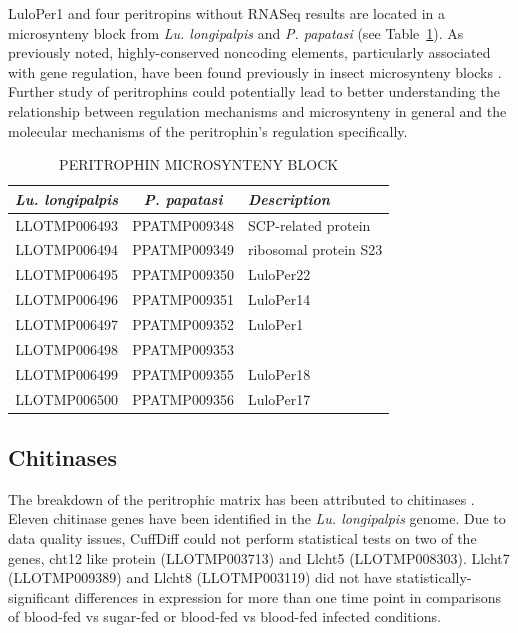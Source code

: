 LuloPer1 and four peritropins without RNASeq results are located in a microsynteny block from \emph{Lu. longipalpis} and \emph{P. papatasi} (see Table~\ref{tab:synteny-llot-ppat-peritrophic}). As previously noted, highly-conserved noncoding elements, particularly associated with gene regulation, have been found previously in insect microsynteny blocks \cite{Engstrom2007}.  Further study of peritrophins could potentially lead to  better understanding the relationship between regulation mechanisms and microsynteny in general and the molecular mechanisms of the peritrophin's regulation specifically.

\begin{table}[H]
  \begin{center}
  \small
  \caption{\label{tab:synteny-llot-ppat-peritrophic} PERITROPHIN MICROSYNTENY BLOCK}
  \begin{tabular}{c c l} \hline
    \emph{Lu. longipalpis} & \emph{P. papatasi} & \emph{Description} \\ \hline
    LLOTMP006493 & PPATMP009348 & SCP-related protein \\
    LLOTMP006494 & PPATMP009349 & ribosomal protein S23 \\
    LLOTMP006495 & PPATMP009350 & LuloPer22 \\
    LLOTMP006496 & PPATMP009351 & LuloPer14 \\
    LLOTMP006497 & PPATMP009352 & LuloPer1 \\
    LLOTMP006498 & PPATMP009353 &  \\
    LLOTMP006499 & PPATMP009355 & LuloPer18 \\
    LLOTMP006500 & PPATMP009356 & LuloPer17
  \end{tabular}
  \end{center}
\end{table}


\subsection{Chitinases}
The breakdown of the peritrophic matrix has been attributed to chitinases \cite{Dostalova2012}. Eleven chitinase genes have been identified in the \emph{Lu. longipalpis} genome. Due to data quality issues, CuffDiff could not perform statistical tests on two of the genes, cht12 like protein (LLOTMP003713) and Llcht5 (LLOTMP008303). Llcht7 (LLOTMP009389) and Llcht8 (LLOTMP003119) did not have statistically-significant differences in expression for more than one time point in comparisons of blood-fed vs sugar-fed or blood-fed vs blood-fed infected conditions.

